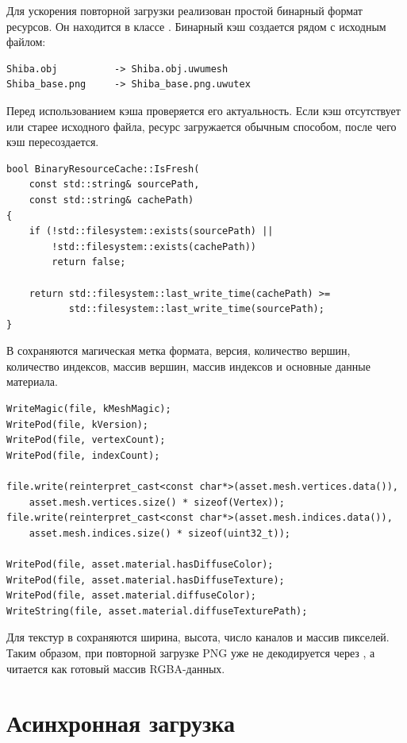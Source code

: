 \documentclass[14pt,a4paper]{extarticle}
\begin{document}
Для ускорения повторной загрузки реализован простой бинарный формат ресурсов. Он находится в классе
. Бинарный кэш создается рядом с исходным файлом:

\begin{verbatim}
Shiba.obj          -> Shiba.obj.uwumesh
Shiba_base.png     -> Shiba_base.png.uwutex
\end{verbatim}

Перед использованием кэша проверяется его актуальность. Если кэш отсутствует или старее исходного файла,
ресурс загружается обычным способом, после чего кэш пересоздается.

\begin{lstlisting}[style=cppgost,caption={Проверка актуальности бинарного кэша}]
bool BinaryResourceCache::IsFresh(
    const std::string& sourcePath,
    const std::string& cachePath)
{
    if (!std::filesystem::exists(sourcePath) ||
        !std::filesystem::exists(cachePath))
        return false;

    return std::filesystem::last_write_time(cachePath) >=
           std::filesystem::last_write_time(sourcePath);
}
\end{lstlisting}

В  сохраняются магическая метка формата, версия, количество вершин, количество индексов,
массив вершин, массив индексов и основные данные материала.

\begin{lstlisting}[style=cppgost,caption={Принцип сохранения меша в бинарный кэш}]
WriteMagic(file, kMeshMagic);
WritePod(file, kVersion);
WritePod(file, vertexCount);
WritePod(file, indexCount);

file.write(reinterpret_cast<const char*>(asset.mesh.vertices.data()),
    asset.mesh.vertices.size() * sizeof(Vertex));
file.write(reinterpret_cast<const char*>(asset.mesh.indices.data()),
    asset.mesh.indices.size() * sizeof(uint32_t));

WritePod(file, asset.material.hasDiffuseColor);
WritePod(file, asset.material.hasDiffuseTexture);
WritePod(file, asset.material.diffuseColor);
WriteString(file, asset.material.diffuseTexturePath);
\end{lstlisting}

Для текстур в  сохраняются ширина, высота, число каналов и массив пикселей. Таким образом,
при повторной загрузке PNG уже не декодируется через , а читается как готовый массив
RGBA-данных.

\section{Асинхронная загрузка}
\end{document}
